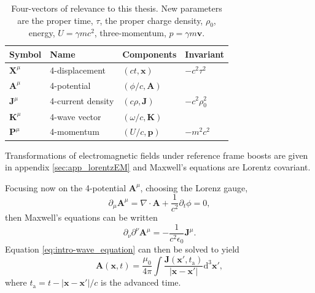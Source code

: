 \begin{table}
	\begin{center}
		\begin{tabular}{llll}
			 \hline \hline
			Symbol & Name & Components & Invariant \\
			\hline
			$\mathbf{X}^\mu$& 4-displacement & $(ct, \mathbf{x})$ & $-c^2\tau^2$  \\
			$\mathbf{A}^\mu$&4-potential  & $(\phi/c, \mathbf{A})$  &  \\
			$\mathbf{J}^\mu$& 4-current density & $(c\rho,\mathbf{J})$ & $-c^2\rho_0^2$ \\
			$\mathbf{K}^\mu$& 4-wave vector &$(\omega/c, \mathbf{K})$  &  \\
			$\mathbf{P}^\mu$& 4-momentum &  $(U/c, \mathbf{p})$& $-m^2c^2$ \\
			\hline \hline
		\end{tabular}
\caption{\label{tab:intro-four-vectors} Four-vectors of relevance to this thesis. New parameters are the proper time, $\tau$, the proper charge density, $\rho_0$, energy, $U = \gamma m c^2$, three-momentum, $p = \gamma m\mathbf{v}$.}
\end{center}
\end{table}
Transformations of electromagnetic fields under reference frame boosts are given in appendix \ref{sec:app_lorentzEM} and Maxwell's equations are Lorentz covariant.

Focusing now on the 4-potential $\mathbf{A}^\mu$, choosing the Lorenz gauge,
\begin{equation}
	 \partial_\mu \mathbf{A}^\mu = \nabla \cdot \mathbf{A} + \frac{1}{c^2}\partial_t \phi = 0,
\end{equation}
then Maxwell's equations can be written
\begin{equation}\label{eq:intro-wave_equation}
	\partial_\nu \partial^\nu \mathbf{A}^\mu = -\frac{1}{c^2\epsilon_0}\mathbf{J}^\mu.
\end{equation}
Equation \ref{eq:intro-wave_equation} can then be solved to yield 
\begin{equation}
	\mathbf{A}(\mathbf{x},t) = \frac{\mu_0}{4\pi} \int \frac{\mathbf{J}(\mathbf{x'},t_\mathrm{a})}{|\mathbf{x}-\mathbf{x}'|} \mathrm{d}^3\mathbf{x}',
\end{equation}
where $t_\mathrm{a} = t- |\mathbf{x}-\mathbf{x}'|/c$ is the advanced time.

